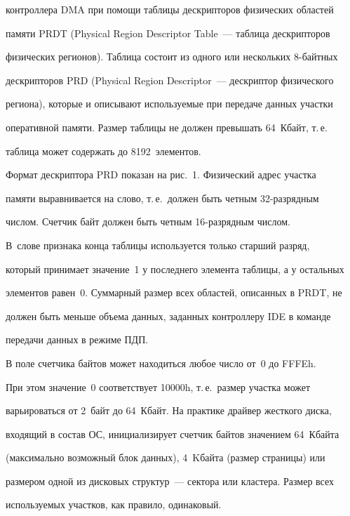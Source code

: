 контроллера DMA при помощи таблицы дескрипторов физических областей 


памяти PRDT (Physical Region Descriptor Table~--- таблица дескрипторов 


физических регионов). Таблица состоит из одного или нескольких 8-байтных 


дескрипторов PRD (Physical Region Descriptor~--- дескриптор физического 


региона), которые и описывают используемые при передаче данных участки 


оперативной памяти. Размер таблицы не должен превышать 64~Кбайт, т.\,е.\ 


таблица может содержать до 8192~элементов.


     


     Формат дескриптора PRD показан на рис.~1. Физический адрес участка 


памяти выравнивается на слово, т.\,е.\ должен быть четным 32-раз\-ряд\-ным 


числом. Счетчик байт должен быть четным 16-раз\-ряд\-ным числом. 


     В~слове признака конца таблицы используется только старший разряд, 


который принимает значение~1 у последнего элемента таблицы, а у остальных 


элементов равен~0. Суммарный размер всех областей, описанных в PRDT, не 


должен быть меньше объема данных, заданных контроллеру IDE в команде 


передачи данных в режиме ПДП.


     


     


     В поле счетчика байтов может находиться любое число от~0 до FFFEh. 


При этом значение~0 соответствует 10000h, т.\,е.\ размер участка может 


варьироваться от 2~байт до 64~Кбайт. На практике драйвер жесткого диска, 


входящий в состав ОС, инициализирует счетчик байтов значением 64~Кбайта 


(максимально возможный блок данных), 4~Kбайта (размер страницы) или 


размером одной из дисковых структур~--- сектора или кластера. Размер всех 


используемых участков, как правило, одинаковый.


